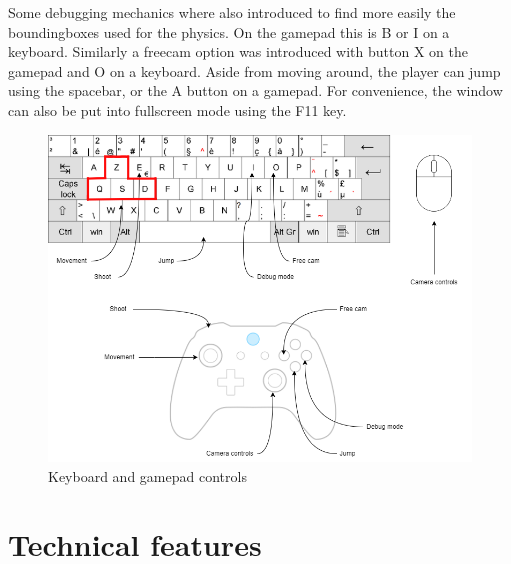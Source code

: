 \documentclass[]{article}
\begin{document}
Some debugging mechanics where also introduced to find more easily the
boundingboxes used for the physics. On the gamepad this is B or I on a keyboard.
Similarly a freecam option was introduced with button X on the gamepad and O on
a keyboard.
Aside from moving around, the player can jump using the spacebar, or the A button on a gamepad.
For convenience, the window can also be put into fullscreen mode using the F11 key.

\begin{figure}[h!]
      \centering
      \includegraphics[width=\textwidth]{diagram.png}
      \caption{Keyboard and gamepad controls}
      \label{fig:diagram}
\end{figure}
\newpage
\section{Technical features}
\end{document}
